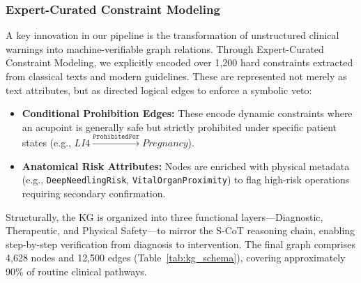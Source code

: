 \documentclass[preprint,5p,times,twocolumn,fleqn]{elsarticle}
\begin{document}
\subsubsection{Expert-Curated Constraint Modeling}
A key innovation in our pipeline is the transformation of unstructured clinical warnings into machine-verifiable graph relations. Through Expert-Curated Constraint Modeling, we explicitly encoded over 1,200 hard constraints extracted from classical texts and modern guidelines. These are represented not merely as text attributes, but as directed logical edges to enforce a symbolic veto:

\begin{itemize}
    \item \textbf{Conditional Prohibition Edges:} These encode dynamic constraints where an acupoint is generally safe but strictly prohibited under specific patient states (e.g., $LI4 \xrightarrow{\texttt{ProhibitedFor}} \textit{Pregnancy}$).
    \item \textbf{Anatomical Risk Attributes:} Nodes are enriched with physical metadata (e.g., \texttt{DeepNeedlingRisk}, \texttt{VitalOrganProximity}) to flag high-risk operations requiring secondary confirmation.
\end{itemize}

Structurally, the KG is organized into three functional layers—Diagnostic, Therapeutic, and Physical Safety—to mirror the S-CoT reasoning chain, enabling step-by-step verification from diagnosis to intervention. The final graph comprises 4,628 nodes and 12,500 edges (Table~\ref{tab:kg_schema}), covering approximately 90\% of routine clinical pathways.
\end{document}

